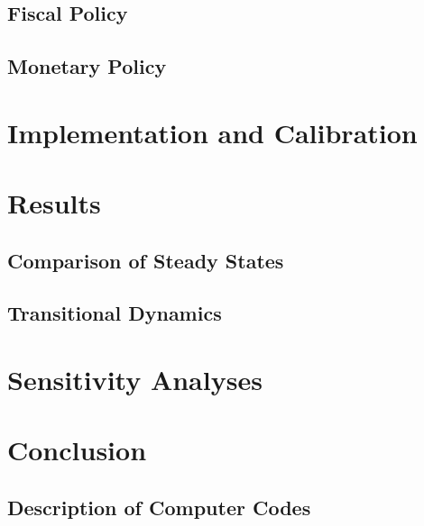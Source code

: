 \documentclass[12pt]{article}
\numberwithin{equation}{section} %
\begin{document}
\subsection{Fiscal Policy}
\label{sec:model-fiscal}

\subsection{Monetary Policy}
\label{sec:model-monetary}

\section{Implementation and Calibration}
\label{sec:implementation}

\section{Results}
\label{sec:results}

\subsection{Comparison of Steady States}
\label{sec:results-stst}

\subsection{Transitional Dynamics}
\label{sec:results-transition}

\section{Sensitivity Analyses}
\label{sec:sensitivity}

\section{Conclusion}
\label{sec:conclusion}

\newpage
\thispagestyle{plain}
\printbibliography[heading=bibintoc] %

\newpage
\thispagestyle{plain}
\begin{appendices}
\section{Description of Computer Codes}
\end{appendices}
\end{document}

